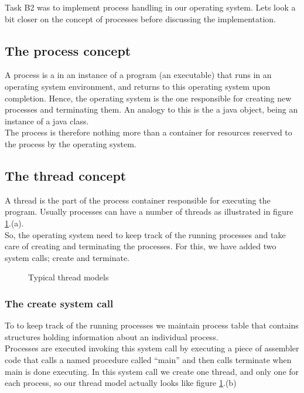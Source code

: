 Task B2 was to implement process handling in our operating system. Lets look a bit closer on the concept of processes before discussing the implementation.
\subsection{The process concept}
A process is a in an instance of a program (an executable) that runs in an operating system environment, 
and returns to this operating system upon completion. Hence, the operating system is the one responsible for 
creating new processes and terminating them. An analogy to this is the a java object, being an instance of a java class.\\
The process is therefore nothing more than a container for resources reserved to the process by the operating system. \\

\subsection{The thread concept}
A thread is the part of the process container responsible for executing the program. Usually processes can have a number of threads as illustrated in figure \ref{fig:thread_models}.(a). \\

So, the operating system need to keep track of the running processes and take care of creating and terminating the processes. 
For this, we have added two system calls; create and terminate.

\begin{figure}
\centering
{}
\caption{Typical thread models}
\label{fig:thread_models}
\end{figure}

\subsubsection*{The create system call}
To to keep track of the running processes we maintain process table that contains structures holding information about an individual process. \\
Processes are executed invoking this system call by executing a piece of assembler code that calls a named procedure called ``main'' and then calls terminate when main is done executing. In this system call we create one thread, and only one for each process, so our thread model actually looks like figure \ref{fig:thread_models}.(b)


